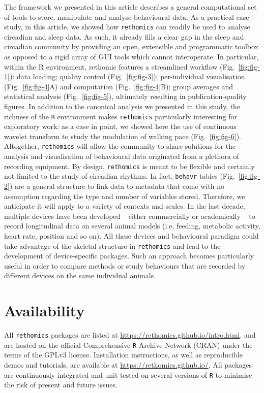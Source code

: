 \documentclass[10pt,letterpaper]{article}\usepackage[]{graphicx}\usepackage[]{color}
\begin{document}
The framework we presented in this article describes a general computational set of tools to store, manipulate and analyse behavioural data. 
As a practical case study, in this article, we showed how \texttt{rethomics} can readily be used to analyse circadian and sleep data.
As such, it already fills a clear gap in the sleep and circadian community by providing an open, extensible and programmatic toolbox as opposed to a rigid array of GUI tools which cannot interoperate. 
In particular, within the R environment, rethomic features a streamlined workflow (Fig.~\ref{fig:fig-1}): data loading; quality control (Fig.~\ref{fig:fig-3}); per-individual visualisation (Fig.~\ref{fig:fig-4}A) and computation (Fig.~\ref{fig:fig-4}B); group averages and statistical analysis (Fig.~\ref{fig:fig-5}), ultimately resulting in publication-quality figures. 
In addition to the canonical analysis we presented in this study, the richness of the \texttt{R} environment makes \texttt{rethomics} particularly interesting for exploratory work: as a case in point, we showed here the use of continuous wavelet transform to study the modulation of walking pace (Fig.~\ref{fig:fig-6}). Altogether, \texttt{rethomics} will allow the community to share solutions for the analysis and visualisation of behavioural data originated from a plethora of recording equipment. 
By design, \texttt{rethomics} is meant to be flexible and certainly not limited to the study of circadian rhythms.
In fact, \texttt{behavr} tables (Fig.~\ref{fig:fig-2}) are a general structure to link data to metadata that come with no assumption regarding the type and number of variables stored.
Therefore, we anticipate it will apply to a variety of contexts and scales.
In the last decade, multiple devices have been developed -- either commercially or academically -- to record longitudinal data on several animal models (i.e. feeding, metabolic activity, heart rate, position and so on).
All these devices and behavioural paradigm could take advantage of the skeletal structure in \texttt{rethomics} and lead to  the development of device-specific packages.
Such an approach becomes particularly useful in order to compare methods or study behaviours that are recorded by different devices on the same individual animals.


\section*{Availability}
All \texttt{rethomics} packages are listed at \href{https://rethomics.github.io/intro.html}{https://rethomics.github.io/intro.html}.
and are hosted on the official Comprehensive \texttt{R} Archive Network (CRAN) under the terms of the GPLv3 license. 
Installation instructions, as well as reproducible demos and tutorials, are available at
\href{https://rethomics.github.io/}{https://rethomics.github.io/}.
All packages are continuously integrated and unit tested on several versions of \texttt{R} to minimise the risk of present and future issues.
\end{document}
